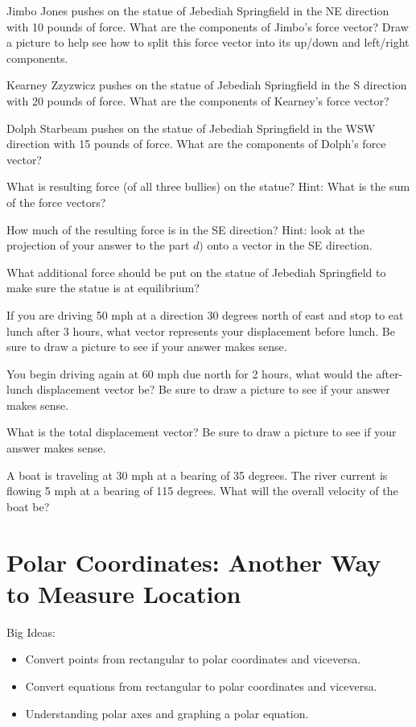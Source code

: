 \bq \be
\item Jimbo Jones pushes on the statue of Jebediah Springfield in the NE direction with 10 pounds of force. What are the components of Jimbo's force vector? Draw a picture to help see how to split this force vector into its up/down and left/right components.
\item Kearney Zzyzwicz pushes on the statue of Jebediah Springfield in the S direction with 20 pounds of force. What are the components of Kearney's force vector?
\item Dolph Starbeam pushes on the statue of Jebediah Springfield in the WSW direction with 15 pounds of force. What are the components of Dolph's force vector?
\item What is resulting force (of all three bullies) on the statue? Hint: What is the sum of the force vectors?
\item How much of the resulting force is in the SE direction? Hint: look at the projection of your answer to the part $d)$ onto a vector in the SE direction.
\item What additional force should be put on the statue of Jebediah Springfield to make sure the statue is at equilibrium?
\ee
\eq

\bq \be
\item If you are driving 50 mph at a direction 30 degrees north of east and stop to eat lunch after 3 hours, what vector represents your displacement before lunch. Be sure to draw a picture to see if your answer makes sense.
\item You begin driving again at 60 mph due north for 2 hours, what would the after-lunch displacement vector be? Be sure to draw a picture to see if your answer makes sense.
\item What is the total displacement vector? Be sure to draw a picture to see if your answer makes sense.
\ee
\eq

\bq A boat is traveling at 30 mph at a bearing of 35 degrees. The river current is flowing 5 mph at a bearing of 115 degrees. What will the overall velocity of the boat be?
\eq

\section{Polar Coordinates: Another Way to Measure Location}
Big Ideas:
\begin{itemize}
\item Convert points from rectangular to polar coordinates and viceversa.
\item Convert equations from rectangular to polar coordinates and viceversa.
\item Understanding polar axes and graphing a polar equation.
\end{itemize}

